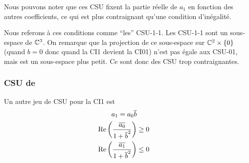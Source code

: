       Nous pouvons noter que ces CSU fixent la partie réelle de \(a_1\) en fonction des autres coefficients, ce qui est plus contraignant qu'une condition d'inégalité.
  
      Nous referons à ces conditions comme ``les'' CSU-1-1. Les CSU-1-1 sont un sous-espace de \(\mathbb C^3\). On remarque que la projection de ce sous-espace sur \(\mathbb C^2 \times \lbrace0\rbrace\) (quand \(b=0\) donc quand la CI1 devient la CI01) n'est pas égale aux CSU-01, mais est un sous-espace plus petit. Ce sont donc des CSU trop contraignantes.
    
    \subsubsection{CSU de \cite{stupfel_implementation_2015}}

      \begin{prop}
        Un autre jeu de CSU pour la CI1 est
        \begin{align}
          a_1 = a_0 {\overline{b}} \\
          \operatorname{Re}\left(\dfrac{{\overline{a_0}}}{1 + {\overline{b}}^2}\right) &\ge 0 \\
          \operatorname{Re}\left(\dfrac{{\overline{a_1}}}{1 + {\overline{b}}^2}\right) &\le 0
        \end{align}
      \end{prop}

